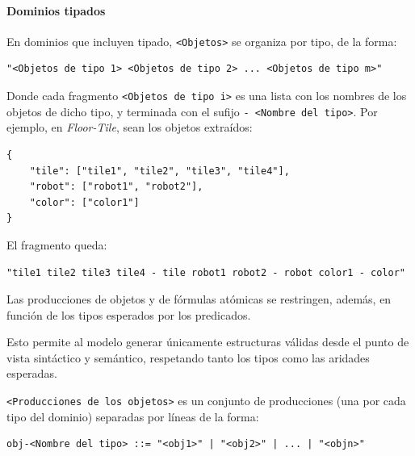 \paragraph{Dominios tipados}

En dominios que incluyen tipado, \texttt{<Objetos>} se organiza por tipo, de la forma:

\begin{tcolorbox}[colback=blue!5!white, colframe=blue!75!black, title=Objetos en dominios tipados con \textit{DAPS}, fonttitle=\bfseries, breakable]
\small
\begin{verbatim}
"<Objetos de tipo 1> <Objetos de tipo 2> ... <Objetos de tipo m>"
\end{verbatim}
\end{tcolorbox}

Donde cada fragmento \texttt{<Objetos de tipo i>} es una lista con los nombres de los objetos de dicho tipo, y terminada con el sufijo \texttt{- <Nombre del tipo>}. Por ejemplo, en  \textit{Floor-Tile}, sean los objetos extraídos:

\begin{tcolorbox}[colback=white, colframe=gray, title=Ejemplo de \texttt{<Objetos>} en dominios tipados con \textit{DAPS}, fonttitle=\bfseries, breakable]
\small
\begin{verbatim}
{
	"tile": ["tile1", "tile2", "tile3", "tile4"],
	"robot": ["robot1", "robot2"],
	"color": ["color1"]
}
\end{verbatim}
\end{tcolorbox}

El fragmento queda:

\begin{tcolorbox}[colback=white, colframe=gray, title=Fragmento \texttt{<Objetos>} en dominios tipados con \textit{DAPS}, fonttitle=\bfseries, breakable]
\small
\begin{verbatim}
"tile1 tile2 tile3 tile4 - tile robot1 robot2 - robot color1 - color"
\end{verbatim}
\end{tcolorbox}

Las producciones de objetos y de fórmulas atómicas se restringen, además, en función de los tipos esperados por los predicados.

Esto permite al modelo generar únicamente estructuras válidas desde el punto de vista sintáctico y semántico, respetando tanto los tipos como las aridades esperadas.

\texttt{<Producciones de los objetos>} es un conjunto de producciones (una por cada tipo del dominio) separadas por líneas de la forma:
\begin{tcolorbox}[colback=blue!5!white, colframe=blue!75!black, title=Producciones de los objetos por tipo (tipado con \textit{DAPS}), fonttitle=\bfseries, breakable]
\small
\begin{verbatim}
obj-<Nombre del tipo> ::= "<obj1>" | "<obj2>" | ... | "<objn>"
\end{verbatim}
\end{tcolorbox}

